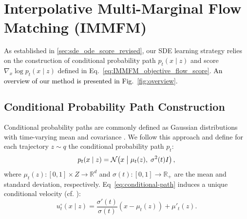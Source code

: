 \documentclass[twoside]{article}
\begin{document}
\section{Interpolative Multi-Marginal Flow Matching (IMMFM)}
\label{sec:IMMFM}

As established in \ref{sec:sde_ode_score_revised}, our SDE learning strategy relies on the construction of conditional probability path \( p_t(x \mid z) \) and score  \(\nabla_x \log p_t(x \mid z)\) defined in Eq.~\eqref{eq:IMMFM_objective_flow_score}. \textcolor{black}{An overview of our method is presented in Fig.~\ref{fig:overview}.}

\subsection{Conditional Probability Path Construction} 
Conditional probability paths are commonly defined as Gaussian distributions with time-varying mean and covariance \citep{lipman2022flow}. We follow this approach and define for each trajectory $z \sim q$ the conditional probability path $p_t$:
\begin{equation}
p_t(x\mid z) = \mathcal{N}\!\left(x\bigm|\mu_t(z),\;\sigma^2(t)I\right),
\label{eq:conditional-path}
\end{equation}
where $\mu_t(z): [0,1] \times Z \rightarrow \mathbb{R}^d$ and $\sigma(t): [0,1] \rightarrow \mathbb{R}_+$ are the mean and standard deviation, respectively. Eq~\ref{eq:conditional-path} induces a unique conditional velocity (cf. \citep[Thm.~3]{lipman2022flow}):
\begin{equation}
u^\circ_t(x \mid z) = \frac{\sigma'(t)}{\sigma(t)}(x - \mu_t(z)) + \mu'_t(z).
\label{eq:drift-function}
\end{equation}

\end{document}
